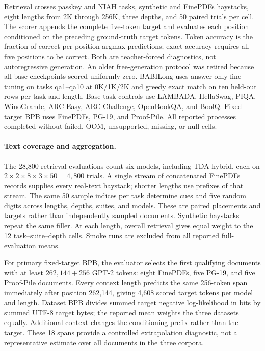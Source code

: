 Retrieval crosses passkey and NIAH tasks, synthetic and FinePDFs haystacks, eight lengths from 2K through 256K, three depths, and 50 paired trials per cell. The scorer appends the complete five-token target and evaluates each position conditioned on the preceding ground-truth target tokens. Token accuracy is the fraction of correct per-position argmax predictions; exact accuracy requires all five positions to be correct. Both are teacher-forced diagnostics, not autoregressive generation. An older free-generation protocol was retired because all base checkpoints scored uniformly zero. BABILong uses answer-only fine-tuning on tasks qa1--qa10 at 0K/1K/2K and greedy exact match on ten held-out rows per task and length. Base-task controls use LAMBADA, HellaSwag, PIQA, WinoGrande, ARC-Easy, ARC-Challenge, OpenBookQA, and BoolQ. Fixed-target BPB uses FinePDFs, PG-19, and Proof-Pile. All reported processes completed without failed, OOM, unsupported, missing, or null cells.

\paragraph{Text coverage and aggregation.}
The 28,800 retrieval evaluations count six models, including TDA hybrid, each on $2\times2\times8\times3\times50=4{,}800$ trials. A single stream of concatenated FinePDFs records supplies every real-text haystack; shorter lengths use prefixes of that stream. The same 50 sample indices per task determine cues and five random digits across lengths, depths, suites, and models. These are paired placements and targets rather than independently sampled documents. Synthetic haystacks repeat the same filler. At each length, overall retrieval gives equal weight to the 12 task--suite--depth cells. Smoke runs are excluded from all reported full-evaluation means.

For primary fixed-target BPB, the evaluator selects the first qualifying documents with at least $262{,}144+256$ GPT-2 tokens: eight FinePDFs, five PG-19, and five Proof-Pile documents. Every context length predicts the same 256-token span immediately after position 262,144, giving 4,608 scored target tokens per model and length. Dataset BPB divides summed target negative log-likelihood in bits by summed UTF-8 target bytes; the reported mean weights the three datasets equally. Additional context changes the conditioning prefix rather than the target. These 18 spans provide a controlled extrapolation diagnostic, not a representative estimate over all documents in the three corpora.


